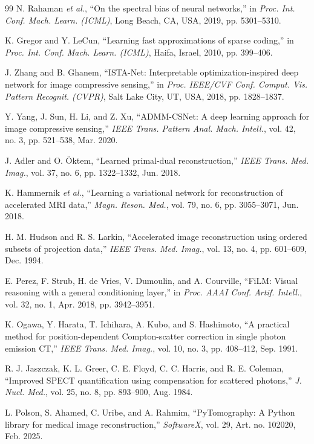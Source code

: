 \documentclass[11pt, a4paper]{article}
\begin{document}
\begin{thebibliography}{99}
 N. Rahaman \textit{et al.}, ``On the spectral bias of neural networks,'' in \textit{Proc. Int. Conf. Mach. Learn. (ICML)}, Long Beach, CA, USA, 2019, pp. 5301--5310.

 K. Gregor and Y. LeCun, ``Learning fast approximations of sparse coding,'' in \textit{Proc. Int. Conf. Mach. Learn. (ICML)}, Haifa, Israel, 2010, pp. 399--406.

 J. Zhang and B. Ghanem, ``ISTA-Net: Interpretable optimization-inspired deep network for image compressive sensing,'' in \textit{Proc. IEEE/CVF Conf. Comput. Vis. Pattern Recognit. (CVPR)}, Salt Lake City, UT, USA, 2018, pp. 1828--1837.

 Y. Yang, J. Sun, H. Li, and Z. Xu, ``ADMM-CSNet: A deep learning approach for image compressive sensing,'' \textit{IEEE Trans. Pattern Anal. Mach. Intell.}, vol. 42, no. 3, pp. 521--538, Mar. 2020.

 J. Adler and O. \"{O}ktem, ``Learned primal-dual reconstruction,'' \textit{IEEE Trans. Med. Imag.}, vol. 37, no. 6, pp. 1322--1332, Jun. 2018.

 K. Hammernik \textit{et al.}, ``Learning a variational network for reconstruction of accelerated MRI data,'' \textit{Magn. Reson. Med.}, vol. 79, no. 6, pp. 3055--3071, Jun. 2018.

 H. M. Hudson and R. S. Larkin, ``Accelerated image reconstruction using ordered subsets of projection data,'' \textit{IEEE Trans. Med. Imag.}, vol. 13, no. 4, pp. 601--609, Dec. 1994.

 E. Perez, F. Strub, H. de Vries, V. Dumoulin, and A. Courville, ``FiLM: Visual reasoning with a general conditioning layer,'' in \textit{Proc. AAAI Conf. Artif. Intell.}, vol. 32, no. 1, Apr. 2018, pp. 3942--3951.

 K. Ogawa, Y. Harata, T. Ichihara, A. Kubo, and S. Hashimoto, ``A practical method for position-dependent Compton-scatter correction in single photon emission CT,'' \textit{IEEE Trans. Med. Imag.}, vol. 10, no. 3, pp. 408--412, Sep. 1991.

 R. J. Jaszczak, K. L. Greer, C. E. Floyd, C. C. Harris, and R. E. Coleman, ``Improved SPECT quantification using compensation for scattered photons,'' \textit{J. Nucl. Med.}, vol. 25, no. 8, pp. 893--900, Aug. 1984.

 L. Polson, S. Ahamed, C. Uribe, and A. Rahmim, ``PyTomography: A Python library for medical image reconstruction,'' \textit{SoftwareX}, vol. 29, Art. no. 102020, Feb. 2025.


\end{thebibliography}
\end{document}
